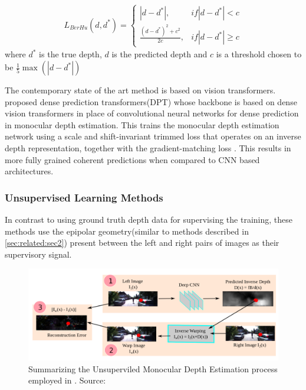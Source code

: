 \begin{align*}
	L_{BerHu}(d, d^{*}) = \begin{cases}
		|d-d^{*}|,  & if |d-d^{*}| < c \\
		\frac{(d-d^{*})^2 + c^2}{2c}, &if |d-d^{*}| \geq c
	\end{cases}
\end{align*}
where $ d^{*} $ is the true depth, $ d $ is the predicted depth and $c$ is a threshold chosen to be $\frac{1}{5} \max(|d-d^{*}|)$

The contemporary state of the art method is based on vision transformers. \cite{ranftl2021vision} proposed dense prediction transformers(DPT) whose backbone is based on dense vision transformers in place of convolutional neural networks for dense prediction in monocular depth estimation. This trains the monocular depth estimation network using a scale and shift-invariant trimmed loss that operates on an inverse depth representation, together with
the gradient-matching loss \cite{ranftl2021vision}.  This results in more fully grained coherent predictions when compared to CNN based architectures. 

\subsubsection*{Unsupervised Learning Methods}
\label{sec:related:sec3:subsec1:part2}

In contrast to using ground truth depth data for supervising the training, these methods use the epipolar geometry(similar to methods described in \ref{sec:related:sec2}) present between the left and right pairs of images as their supervisory signal.
\begin{figure}[h!]
	\centering
	\includegraphics[width=\linewidth]{content/imgs/unsup}
	\caption{Summarizing the Unsuperviled Monocular Depth Estimation process employed in \cite{10.1007/978-3-319-46484-8_45}. Source: \cite{10.1007/978-3-319-46484-8_45}}
	\label{fig:unsup}
\end{figure}


